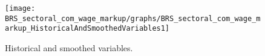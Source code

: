  
\begin{figure}[H]
\centering 
\texttt{[image: BRS\_sectoral\_com\_wage\_markup/graphs/BRS\_sectoral\_com\_wage\_markup\_HistoricalAndSmoothedVariables1]}
\caption{Historical and smoothed variables.}\label{Fig:HistoricalAndSmoothedVariables:1}
\end{figure}


